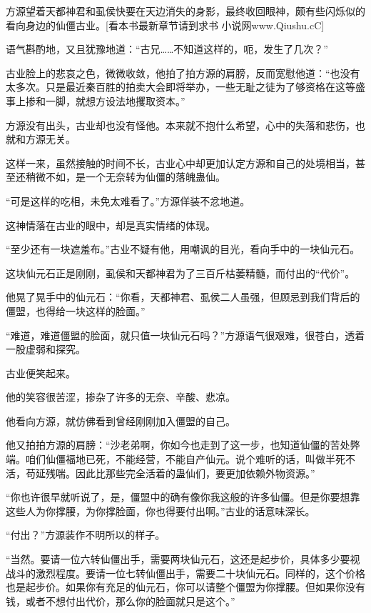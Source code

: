 
\begin{this_body}

方源望着天都神君和虱侯快要在天边消失的身影，最终收回眼神，颇有些闪烁似的看向身边的仙僵古业。[看本书最新章节请到求书 小说网www.Qiushu.cC]

语气斟酌地，又且犹豫地道：“古兄……不知道这样的，呃，发生了几次？”

古业脸上的悲哀之色，微微收敛，他拍了拍方源的肩膀，反而宽慰他道：“也没有太多次。只是最近秦百胜的拍卖大会即将举办，一些无耻之徒为了够资格在这等盛事上掺和一脚，就想方设法地攫取资本。”

方源没有出头，古业却也没有怪他。本来就不抱什么希望，心中的失落和悲伤，也就和方源无关。

这样一来，虽然接触的时间不长，古业心中却更加认定方源和自己的处境相当，甚至还稍微不如，是一个无奈转为仙僵的落魄蛊仙。

“可是这样的吃相，未免太难看了。”方源佯装不忿地道。

这神情落在古业的眼中，却是真实情绪的体现。

“至少还有一块遮羞布。”古业不疑有他，用嘲讽的目光，看向手中的一块仙元石。

这块仙元石正是刚刚，虱侯和天都神君为了三百斤枯萎精髓，而付出的“代价”。

他晃了晃手中的仙元石：“你看，天都神君、虱侯二人虽强，但顾忌到我们背后的僵盟，也得给一块这样的脸面。”

“难道，难道僵盟的脸面，就只值一块仙元石吗？”方源语气很艰难，很苍白，透着一股虚弱和探究。

古业便笑起来。

他的笑容很苦涩，掺杂了许多的无奈、辛酸、悲凉。

他看向方源，就仿佛看到曾经刚刚加入僵盟的自己。

他又拍拍方源的肩膀：“沙老弟啊，你如今也走到了这一步，也知道仙僵的苦处弊端。咱们仙僵福地已死，不能经营，不能自产仙元。说个难听的话，叫做半死不活，苟延残喘。因此比那些完全活着的蛊仙们，要更加依赖外物资源。”

“你也许很早就听说了，是，僵盟中的确有像你我这般的许多仙僵。但是你要想靠这些人为你撑腰，为你撑脸面，你也得要付出啊。”古业的话意味深长。

“付出？”方源装作不明所以的样子。

“当然。要请一位六转仙僵出手，需要两块仙元石，这还是起步价，具体多少要视战斗的激烈程度。要请一位七转仙僵出手，需要二十块仙元石。同样的，这个价格也是起步价。如果你有充足的仙元石，你可以请整个僵盟为你撑腰。但如果你没有钱，或者不想付出代价，那么你的脸面就只是这个。”


\end{this_body}
